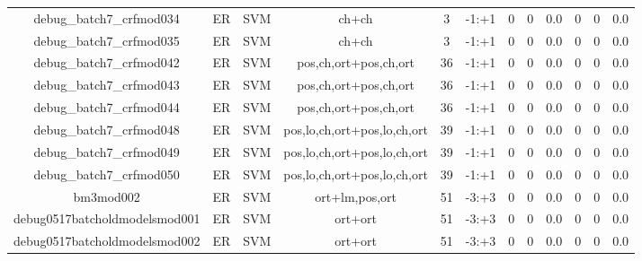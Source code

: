 \documentclass[a4paper]{article}
\begin{document}
\begin{landscape}
\begin{center}
\begin{tabular}{ |c|c|c|c|c|c|c|c|c|c|c|c|}
 	

 
 	
 	\small{ debug\_batch7\_crfmod034 } & ER & SVM & ch+ch  &  3 &  -1:+1  &  0 & 0 & 0.0  &  0 & 0 & 0.0 \\
 	

 
 	
 	\small{ debug\_batch7\_crfmod035 } & ER & SVM & ch+ch  &  3 &  -1:+1  &  0 & 0 & 0.0  &  0 & 0 & 0.0 \\
 	

 
 	
 	\small{ debug\_batch7\_crfmod042 } & ER & SVM & pos,ch,ort+pos,ch,ort  &  36 &  -1:+1  &  0 & 0 & 0.0  &  0 & 0 & 0.0 \\
 	

 
 	
 	\small{ debug\_batch7\_crfmod043 } & ER & SVM & pos,ch,ort+pos,ch,ort  &  36 &  -1:+1  &  0 & 0 & 0.0  &  0 & 0 & 0.0 \\
 	

 
 	
 	\small{ debug\_batch7\_crfmod044 } & ER & SVM & pos,ch,ort+pos,ch,ort  &  36 &  -1:+1  &  0 & 0 & 0.0  &  0 & 0 & 0.0 \\
 	

 
 	
 	\small{ debug\_batch7\_crfmod048 } & ER & SVM & pos,lo,ch,ort+pos,lo,ch,ort  &  39 &  -1:+1  &  0 & 0 & 0.0  &  0 & 0 & 0.0 \\
 	

 
 	
 	\small{ debug\_batch7\_crfmod049 } & ER & SVM & pos,lo,ch,ort+pos,lo,ch,ort  &  39 &  -1:+1  &  0 & 0 & 0.0  &  0 & 0 & 0.0 \\
 	

 
 	
 	\small{ debug\_batch7\_crfmod050 } & ER & SVM & pos,lo,ch,ort+pos,lo,ch,ort  &  39 &  -1:+1  &  0 & 0 & 0.0  &  0 & 0 & 0.0 \\
 	

 
 	
 	\small{ bm3mod002 } & ER & SVM & ort+lm,pos,ort  &  51 &  -3:+3  &  0 & 0 & 0.0  &  0 & 0 & 0.0 \\
 	

 
 	
 	\small{ debug0517batcholdmodelsmod001 } & ER & SVM & ort+ort  &  51 &  -3:+3  &  0 & 0 & 0.0  &  0 & 0 & 0.0 \\
 	

 
 	
 	\small{ debug0517batcholdmodelsmod002 } & ER & SVM & ort+ort  &  51 &  -3:+3  &  0 & 0 & 0.0  &  0 & 0 & 0.0 \\
 	


\end{tabular}
\end{center}
\end{landscape}
\end{document}
